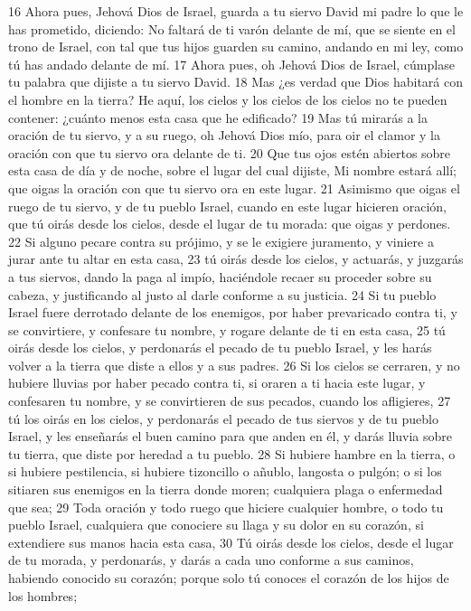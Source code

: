 16 Ahora pues, Jehová Dios de Israel, guarda  a  tu siervo David mi padre lo que le has prometido, diciendo: No faltará de ti varón delante de mí, que se siente en el trono de Israel,  con tal que tus hijos guarden su camino, andando en mi ley, como tú has andado delante de mí. 
17 Ahora pues, oh Jehová Dios de Israel, cúmplase tu palabra que dijiste  a  tu siervo David.
18 Mas ¿es verdad que Dios habitará con el hombre en la tierra? He aquí, los cielos y los cielos de los cielos no te pueden contener: ¿cuánto menos esta casa que he edificado? 
19 Mas tú mirarás  a  la oración de tu siervo, y  a  su ruego, oh Jehová Dios mío, para oir el clamor y la oración con que tu siervo ora delante de ti.
20 Que tus ojos estén abiertos sobre esta casa de día y de noche, sobre el lugar del cual dijiste, Mi nombre estará allí; que oigas la oración con que tu siervo ora en este lugar.
21 Asimismo que oigas el ruego de tu siervo, y de tu pueblo Israel, cuando en este lugar hicieren oración, que tú oirás desde los cielos, desde el lugar de tu morada: que oigas y perdones.
22 Si alguno pecare contra su prójimo, y se le exigiere juramento, y viniere a jurar ante tu  altar en esta casa,
23 tú oirás desde los cielos, y actuarás, y juzgarás  a  tus siervos, dando la paga al impío, haciéndole recaer su proceder sobre su cabeza, y justificando al justo al darle conforme a su justicia.
24 Si tu pueblo Israel fuere derrotado delante de los enemigos, por haber prevaricado contra ti, y se convirtiere, y confesare tu nombre, y rogare delante de ti en esta casa,
25 tú oirás desde los cielos, y perdonarás el pecado de tu pueblo Israel, y les harás volver a la tierra que diste a ellos y a sus padres.
26 Si los cielos se cerraren, y no hubiere lluvias por haber pecado contra ti, si oraren a ti hacia este lugar, y confesaren tu nombre, y se convirtieren de sus pecados, cuando los afligieres,
27 tú los oirás en los cielos, y perdonarás el pecado de tus siervos y de tu pueblo Israel, y les enseñarás el buen camino para que anden en él, y darás lluvia sobre tu tierra, que diste por heredad a tu pueblo.
28 Si hubiere hambre en la tierra, o si hubiere pestilencia, si hubiere tizoncillo o añublo, langosta o pulgón; o si los sitiaren sus enemigos en la tierra donde moren; cualquiera plaga o enfermedad que sea;
29 Toda oración y todo ruego que hiciere cualquier hombre, o todo tu pueblo Israel, cualquiera que conociere su llaga y su dolor en su corazón, si extendiere sus manos hacia esta casa,
30 Tú oirás desde los cielos, desde el lugar de tu morada, y perdonarás, y darás a cada uno conforme a sus caminos, habiendo conocido su corazón; porque solo tú conoces el corazón de los hijos de los hombres;
